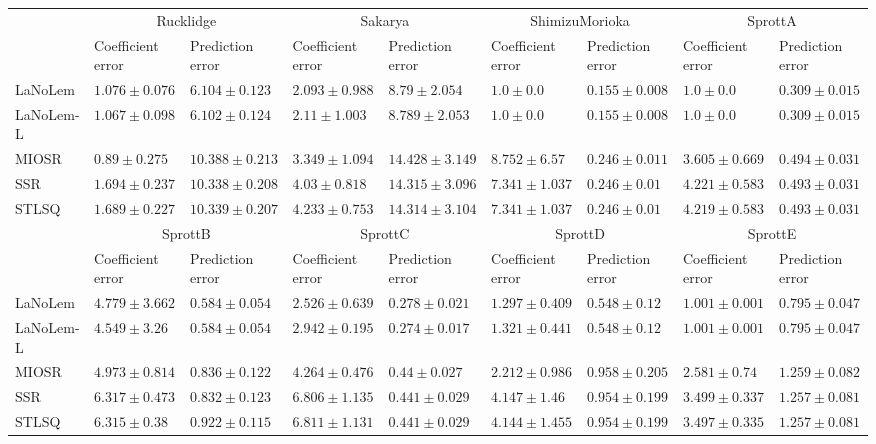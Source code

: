 \begin{table*}
{\begin{tabular}{lllllllll}
\midrule

 & \multicolumn{2}{c}{Rucklidge} & \multicolumn{2}{c}{Sakarya} & \multicolumn{2}{c}{ShimizuMorioka} & \multicolumn{2}{c}{SprottA} \\
 & Coefficient error & Prediction error & Coefficient error & Prediction error & Coefficient error & Prediction error & Coefficient error & Prediction error \\
\midrule
LaNoLem & $1.076\pm 0.076$ & $6.104\pm 0.123$ & $\mathbf{2.093}\pm 0.988$ & $8.79\pm 2.054$ & $\mathbf{1.0}\pm 0.0$ & $0.155\pm 0.008$ & $\mathbf{1.0}\pm 0.0$ & $0.309\pm 0.015$ \\
LaNoLem-L & $1.067\pm 0.098$ & $\mathbf{6.102}\pm 0.124$ & $2.11\pm 1.003$ & $\mathbf{8.789}\pm 2.053$ & $\mathbf{1.0}\pm 0.0$ & $\mathbf{0.155}\pm 0.008$ & $\mathbf{1.0}\pm 0.0$ & $\mathbf{0.309}\pm 0.015$ \\
MIOSR & $\mathbf{0.89}\pm 0.275$ & $10.388\pm 0.213$ & $3.349\pm 1.094$ & $14.428\pm 3.149$ & $8.752\pm 6.57$ & $0.246\pm 0.011$ & $3.605\pm 0.669$ & $0.494\pm 0.031$ \\
SSR & $1.694\pm 0.237$ & $10.338\pm 0.208$ & $4.03\pm 0.818$ & $14.315\pm 3.096$ & $7.341\pm 1.037$ & $0.246\pm 0.01$ & $4.221\pm 0.583$ & $0.493\pm 0.031$ \\
STLSQ & $1.689\pm 0.227$ & $10.339\pm 0.207$ & $4.233\pm 0.753$ & $14.314\pm 3.104$ & $7.341\pm 1.037$ & $0.246\pm 0.01$ & $4.219\pm 0.583$ & $0.493\pm 0.031$ \\

\midrule

 & \multicolumn{2}{c}{SprottB} & \multicolumn{2}{c}{SprottC} & \multicolumn{2}{c}{SprottD} & \multicolumn{2}{c}{SprottE} \\
 & Coefficient error & Prediction error & Coefficient error & Prediction error & Coefficient error & Prediction error & Coefficient error & Prediction error \\
\midrule
LaNoLem & $4.779\pm 3.662$ & $\mathbf{0.584}\pm 0.054$ & $\mathbf{2.526}\pm 0.639$ & $0.278\pm 0.021$ & $\mathbf{1.297}\pm 0.409$ & $0.548\pm 0.12$ & $\mathbf{1.001}\pm 0.001$ & $\mathbf{0.795}\pm 0.047$ \\
LaNoLem-L & $\mathbf{4.549}\pm 3.26$ & $0.584\pm 0.054$ & $2.942\pm 0.195$ & $\mathbf{0.274}\pm 0.017$ & $1.321\pm 0.441$ & $\mathbf{0.548}\pm 0.12$ & $1.001\pm 0.001$ & $0.795\pm 0.047$ \\
MIOSR & $4.973\pm 0.814$ & $0.836\pm 0.122$ & $4.264\pm 0.476$ & $0.44\pm 0.027$ & $2.212\pm 0.986$ & $0.958\pm 0.205$ & $2.581\pm 0.74$ & $1.259\pm 0.082$ \\
SSR & $6.317\pm 0.473$ & $0.832\pm 0.123$ & $6.806\pm 1.135$ & $0.441\pm 0.029$ & $4.147\pm 1.46$ & $0.954\pm 0.199$ & $3.499\pm 0.337$ & $1.257\pm 0.081$ \\
STLSQ & $6.315\pm 0.38$ & $0.922\pm 0.115$ & $6.811\pm 1.131$ & $0.441\pm 0.029$ & $4.144\pm 1.455$ & $0.954\pm 0.199$ & $3.497\pm 0.335$ & $1.257\pm 0.081$ \\


\end{tabular}}
\end{table*}
